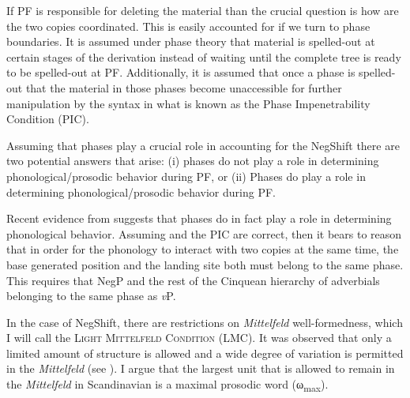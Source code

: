 \documentclass[12pt, letterpaper]{article}
\newcommand{\sub}[1]{\textsubscript{#1}}
\begin{document}
If PF is responsible for deleting the material than the crucial question is how are the two copies coordinated. This is easily accounted for if we turn to phase boundaries. It is assumed under phase theory \citep{chomskyPhases2008} that material is spelled-out at certain stages of the derivation instead of waiting until the complete tree is ready to be spelled-out at PF. Additionally, it is assumed that once a phase is spelled-out that the material in those phases become unaccessible for further manipulation by the syntax in what is known as the Phase Impenetrability Condition (PIC). 

Assuming that phases play a crucial role in accounting for the NegShift there are two potential answers that arise: (i) phases do not play a role in determining phonological/prosodic behavior during PF, or (ii) Phases do play a role in determining phonological/prosodic behavior during PF.

Recent evidence from \citet{weberPhaseBasedConstraints2021} suggests that phases do in fact play a role in determining phonological behavior. Assuming \citeauthor{weberPhaseBasedConstraints2021} and the PIC are correct, then it bears to reason that in order for the phonology to interact with two copies at the same time, the base generated position and the landing site both must belong to the same phase. This requires that NegP and the rest of the Cinquean hierarchy of adverbials \citep{cinqueAdverbsFunctionalHeads1999} belonging to the same phase as \emph{v}P.

In the case of NegShift, there are restrictions on \emph{Mittelfeld} well-formedness, which I will call the \textsc{Light Mittelfeld Condition} (LMC). It was observed that only a limited amount of structure is allowed and a wide degree of variation is permitted in the \emph{Mittelfeld} (see \cite{haiderMittelfeldPhenomenaScrambling2017}). I argue that the largest unit that is allowed to remain in the \emph{Mittelfeld} in Scandinavian is a maximal prosodic word (ω\sub{max}).
\end{document}
